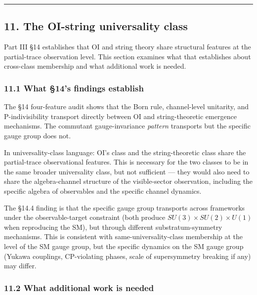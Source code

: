 \documentclass[
]{article}
\begin{document}
\begin{center}\rule{0.5\linewidth}{0.5pt}\end{center}

\hypertarget{the-oi-string-universality-class}{%
\subsection{11. The OI-string universality
class}\label{the-oi-string-universality-class}}

Part III §14 establishes that OI and string theory share structural
features at the partial-trace observation level. This section examines
what that establishes about cross-class membership and what additional
work is needed.

\hypertarget{what-14s-findings-establish}{%
\subsubsection{11.1 What §14's findings
establish}\label{what-14s-findings-establish}}

The §14 four-feature audit shows that the Born rule, channel-level
unitarity, and P-indivisibility transport directly between OI and
string-theoretic emergence mechanisms. The commutant gauge-invariance
\emph{pattern} transports but the specific gauge group does not.

In universality-class language: OI's class and the string-theoretic
class share the partial-trace observational features. This is necessary
for the two classes to be in the same broader universality class, but
not sufficient --- they would also need to share the algebra-channel
structure of the visible-sector observation, including the specific
algebra of observables and the specific channel dynamics.

The §14.4 finding is that the specific gauge group transports across
frameworks under the observable-target constraint (both produce
\(SU(3) \times SU(2) \times U(1)\) when reproducing the SM), but through
different substratum-symmetry mechanisms. This is consistent with
same-universality-class membership at the level of the SM gauge group,
but the specific dynamics on the SM gauge group (Yukawa couplings,
CP-violating phases, scale of supersymmetry breaking if any) may differ.

\hypertarget{what-additional-work-is-needed}{%
\subsubsection{11.2 What additional work is
needed}\label{what-additional-work-is-needed}}
\end{document}

